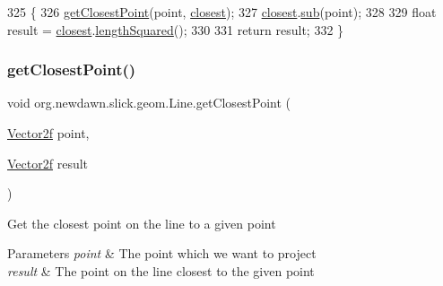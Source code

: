 \begin{DoxyCode}
325                                                  \{
326         \mbox{\hyperlink{classorg_1_1newdawn_1_1slick_1_1geom_1_1_line_ae555b65b604e0bed3e650ab156375a99}{getClosestPoint}}(point, \mbox{\hyperlink{classorg_1_1newdawn_1_1slick_1_1geom_1_1_line_a9ca28ca6a3b18057161bf8cd4c5f2a36}{closest}});
327         \mbox{\hyperlink{classorg_1_1newdawn_1_1slick_1_1geom_1_1_line_a9ca28ca6a3b18057161bf8cd4c5f2a36}{closest}}.\mbox{\hyperlink{classorg_1_1newdawn_1_1slick_1_1geom_1_1_vector2f_ac263b2353b2e095d13cb7ca169c04c5d}{sub}}(point);
328 
329         \textcolor{keywordtype}{float} result = \mbox{\hyperlink{classorg_1_1newdawn_1_1slick_1_1geom_1_1_line_a9ca28ca6a3b18057161bf8cd4c5f2a36}{closest}}.\mbox{\hyperlink{classorg_1_1newdawn_1_1slick_1_1geom_1_1_vector2f_a1c4197040609de8f2ef13fc3342ee7da}{lengthSquared}}();
330 
331         \textcolor{keywordflow}{return} result;
332     \}
\end{DoxyCode}
\mbox{\label{classorg_1_1newdawn_1_1slick_1_1geom_1_1_line_ae555b65b604e0bed3e650ab156375a99}} 
\subsubsection{\texorpdfstring{get\+Closest\+Point()}{getClosestPoint()}}
{\footnotesize\ttfamily void org.\+newdawn.\+slick.\+geom.\+Line.\+get\+Closest\+Point (\begin{DoxyParamCaption}\item[{\mbox{\hyperlink{classorg_1_1newdawn_1_1slick_1_1geom_1_1_vector2f}{Vector2f}}}]{point,  }\item[{\mbox{\hyperlink{classorg_1_1newdawn_1_1slick_1_1geom_1_1_vector2f}{Vector2f}}}]{result }\end{DoxyParamCaption})\hspace{0.3cm}{\ttfamily [inline]}}

Get the closest point on the line to a given point


\begin{DoxyParams}{Parameters}
{\em point} & The point which we want to project \\
\hline
{\em result} & The point on the line closest to the given point \\
\hline
\end{DoxyParams}


